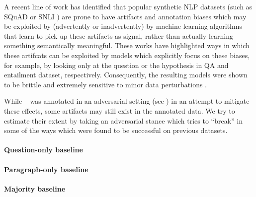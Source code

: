 

A recent line of work \cite{Gururangan:2018,Kaushik2018HowMR} has identified that popular synthetic NLP datasets
(such as SQuAD \cite{Rajpurkar2016SQuAD10} or SNLI \cite{Bowman2015ALA}) are prone to have artifacts and annotation biases which may be exploited by (advertently or inadvertently) by machine learning algorithms that
learn to pick up these artifacts as signal,
rather than actually learning something semantically meaningful.
These works have highlighted ways in which these artifcats can be exploited by models which explicitly focus on these biases, for example, by
 looking only at the question or the hypothesis in QA and entailment dataset, respectively.
Consequently, the resulting models were shown to be brittle and extremely sensitive
to minor data perturbations \cite{Glockner2018BreakingNS,others}.

While \drop~ was annotated in an adversarial setting
(see ) in an attempt to mitigate these effects, some
artifacts may still exist in the annotated data.
We try to estimate their extent by taking an adversarial
stance which tries to ``break'' \drop in some of the ways 
which were found to be successful on previous datasets.

\paragraph{Question-only baseline}

\paragraph{Paragraph-only baseline}

\paragraph{Majority baseline}

